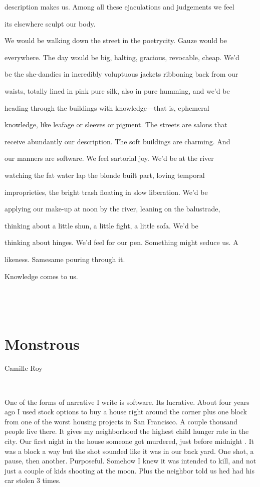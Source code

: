 description makes us. Among all these ejaculations and judgements we
feel

its elsewhere sculpt our body.

We would be walking down the street in the poetrycity. Gauze would be

everywhere. The day would be big, halting, gracious, revocable, cheap.
We'd

be the she-dandies in incredibly voluptuous jackets ribboning back from
our

waists, totally lined in pink pure silk, also in pure humming, and we'd
be

heading through the buildings with knowledge---that is, ephemeral

knowledge, like leafage or sleeves or pigment. The streets are salons
that

receive abundantly our description. The soft buildings are charming. And

our manners are software. We feel sartorial joy. We'd be at the river

watching the fat water lap the blonde built part, loving temporal

improprieties, the bright trash floating in slow liberation. We'd be

applying our make-up at noon by the river, leaning on the balustrade,

thinking about a little shun, a little fight, a little sofa. We'd be

thinking about hinges. We'd feel for our pen. Something might seduce us.
A

likeness. Samesame pouring through it.

Knowledge comes to us.

~

~

\hypertarget{monstrous}{%
\section{Monstrous}\label{monstrous}}

Camille Roy

~

One of the forms of narrative I write is software. Its lucrative. About
four years ago I used stock options to buy a house right around the
corner plus one block from one of the worst housing projects in San
Francisco. A couple thousand people live there. It gives my neighborhood
the highest child hunger rate in the city. Our first night in the house
someone got murdered, just before midnight . It was a block a way but
the shot sounded like it was in our back yard. One shot, a pause, then
another. Purposeful. Somehow I knew it was intended to kill, and not
just a couple of kids shooting at the moon. Plus the neighbor told us
hed had his car stolen 3 times.


